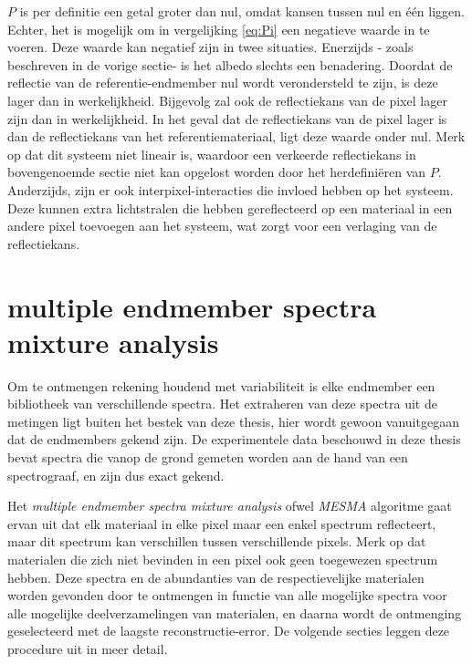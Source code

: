 \documentclass[12pt]{report}
\begin{document}
$P$ is per definitie een getal groter dan nul, omdat kansen tussen nul en \'e\'en liggen. Echter, het is mogelijk om in vergelijking \ref{eq:Pi} een negatieve waarde in te voeren. Deze waarde kan negatief zijn in twee situaties. Enerzijds - zoals beschreven in de vorige sectie- is het albedo slechts een benadering. Doordat de reflectie van de referentie-endmember nul wordt verondersteld te zijn, is deze lager dan in werkelijkheid. Bijgevolg zal ook de reflectiekans van de pixel lager zijn dan in werkelijkheid. In het geval dat de reflectiekans van de pixel lager is dan de reflectiekans van het referentiemateriaal, ligt deze waarde onder nul. Merk op dat dit systeem niet lineair is, waardoor een verkeerde reflectiekans in bovengenoemde sectie niet kan opgelost worden door het herdefini\"eren van $P$. Anderzijds, zijn er ook interpixel-interacties die invloed hebben op het systeem. Deze kunnen extra lichtstralen die hebben gereflecteerd op een materiaal in een andere pixel toevoegen aan het systeem, wat zorgt voor een verlaging van de reflectiekans. 






\section{multiple endmember spectra mixture analysis} \label{sec:mesma}

Om te ontmengen rekening houdend met variabiliteit is elke endmember een bibliotheek van verschillende spectra. Het extraheren van deze spectra uit de metingen ligt buiten het bestek van deze thesis, hier wordt gewoon vanuitgegaan dat de endmembers gekend zijn. De experimentele data beschouwd in deze thesis bevat spectra die vanop de grond gemeten worden aan de hand van een spectrograaf, en zijn dus exact gekend.

Het \textit{multiple endmember spectra mixture analysis} ofwel \textit{MESMA} algoritme gaat ervan uit dat elk materiaal in elke pixel maar een enkel spectrum reflecteert, maar dit spectrum kan verschillen tussen verschillende pixels.  Merk op dat materialen die zich niet bevinden in een pixel ook geen toegewezen spectrum hebben. Deze spectra en de abundanties van de respectievelijke materialen worden gevonden door te ontmengen in functie van alle mogelijke spectra voor alle mogelijke deelverzamelingen van materialen, en daarna wordt de ontmenging geselecteerd met de laagste reconstructie-error. De volgende secties leggen deze procedure uit in meer detail.
\end{document}
